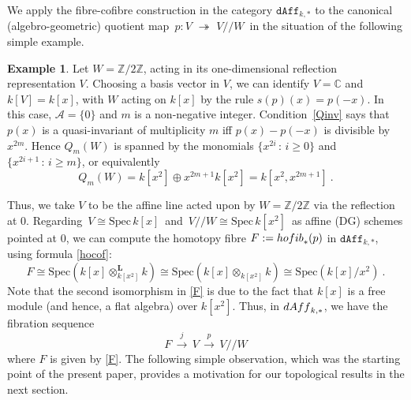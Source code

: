 \documentclass[11pt]{amsart}
\theoremstyle{definition}
\newtheorem{example}[theorem]{Example}
\theoremstyle{remark}
\numberwithin{equation}{section}
\newcommand{\onto}{\,\,\twoheadrightarrow\,\,}
\newcommand{\la}{\label}
\newcommand{\Spec}{\mathrm{Spec}}
\def\c{\mathbb{C}}
\def\A{\mathcal{A}}
\def\L{\boldsymbol{L}}
\def\Z{\mathbb{Z}}
\def\dAff{\mathtt{dAff}}
\begin{document}
We apply the fibre-cofibre construction in the category $ \dAff_{k, \ast} $ to the canonical (algebro-geometric) quotient map $\,p: V \onto V/\!/W \,$ in the situation 
of the following simple example. 
%
\begin{example}
\la{E2}
Let $ W = \Z/2\Z $, acting in its one-dimensional reflection representation $ V $. Choosing a basis vector in $V$, we can identify 
$ V = \c $ and $ k[V] = k[x] $, with $W$ acting on $k[x]$ by the rule $ s(p)(x) = p(-x)$.
In this case, $ \A = \{0\} $ and $m$ is a non-negative integer. Condition~\eqref{Qinv} says that 
$ p(x) $ is a quasi-invariant of multiplicity $m$ iff $ p(x) - p(-x) $ is divisible 
by $ x^{2m} $. Hence $ Q_m(W) $ is spanned by the monomials $ \{x^{2i}\,:\, i \ge 0\} $ and $ \{x^{2i+1}\,:\, i \ge m\} $, or equivalently
$$ 
Q_m(W) = k[x^2] \oplus x^{2m+1} k[x^2] = k[x^2, x^{2m+1}]\ .
$$
%
\end{example}
%
Thus, we take $ V $ to be the affine line acted upon by $ W = \Z/2\Z $ via the reflection at $ 0 $. Regarding $\, V \cong \Spec \,k[x]\,$ and $\, V/\!/W \cong \Spec\, k[x^2] \,$ as affine (DG) schemes pointed at $0$, we can compute the homotopy fibre $ F :=  {\rm hofib}_*(p) $ in $\dAff_{k, \ast}$, using formula \eqref{hocof}:
%
\begin{equation} \la{F}
F \cong \Spec\left(k[x] \otimes^{\L}_{k[x^2]} k\right) \cong \Spec \left(k[x] \otimes_{k[x^2]} k\right) \cong  \Spec(k[x]/x^2)\ .
\end{equation}
%
Note that the second isomorphism in \eqref{F} is due to the fact that $ k[x] $ is a free module (and hence, a flat algebra) over $ k[x^2] $. Thus, in $ {\rm dAff}_{k,\ast} $, we have the fibration sequence 
%
\begin{equation}
\la{AW}
F \,\xrightarrow{j}\, V \,\xrightarrow{p}\, V/\!/W
\end{equation}
%
where $F$ is given by \eqref{F}. The following simple observation, which was the starting point of the present paper, provides
 a motivation for our topological results in the next section.
%
\end{document}
